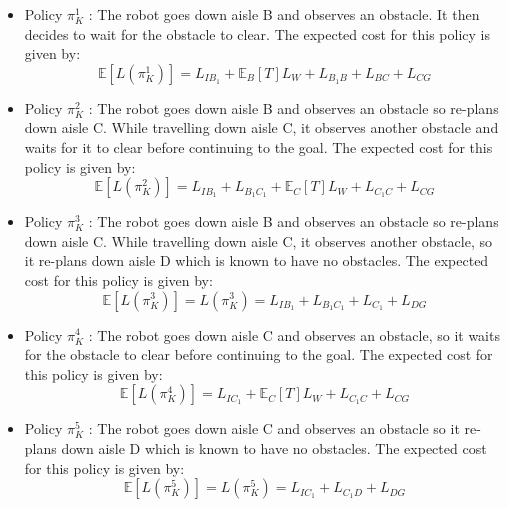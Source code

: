 \documentclass[a4paper,12pt]{article}
\begin{document}
			\begin{itemize}
				\item Policy $\pi_{K}^{1}$ : The robot goes down aisle B and observes an obstacle. It then decides to wait for the obstacle to clear. The expected cost for this policy is given by:
				\begin{equation}
				\mathbb{E}\left[L\left(\pi_{K}^{1}\right)\right] = L_{IB_1} + \mathbb{E}_{B}\left[T\right]L_W + L_{B_1B} + L_{BC} + L_{CG}
				\label{eqn:policyOneCost}
				\end{equation}
				
				\item Policy $\pi_{K}^{2}$ : The robot goes down aisle B and observes an obstacle so re-plans down aisle C. While travelling down aisle C, it observes another obstacle and waits for it to clear before continuing to the goal. The expected cost for this policy is given by:
				\begin{equation}
				\mathbb{E}\left[L\left(\pi_{K}^{2}\right)\right] = L_{IB_1} + L_{B_1C_1} + \mathbb{E}_{C}\left[T\right]L_W + L_{C_1C} + L_{CG}
				\label{eqn:policyTwoCost}
				\end{equation}
				
				\item Policy $\pi_{K}^{3}$ : The robot goes down aisle B and observes an obstacle so re-plans down aisle C. While travelling down aisle C, it observes another obstacle, so it re-plans down aisle D which is known to have no obstacles. The expected cost for this policy is given by:
				\begin{equation}
				\mathbb{E}\left[L\left(\pi_{K}^{3}\right)\right] = L\left(\pi_{K}^{3}\right) = L_{IB_1} + L_{B_1C_1} + L_{C_1} + L_{DG}
				\label{eqn:policyThreeCost}
				\end{equation}
				
				\item Policy $\pi_{K}^{4}$ : The robot goes down aisle C and observes an obstacle, so it waits for the obstacle to clear before continuing to the goal. The expected cost for this policy is given by:
				\begin{equation}
				\mathbb{E}\left[L\left(\pi_{K}^{4}\right)\right] = L_{IC_1} + \mathbb{E}_{C}\left[T\right]L_W + L_{C_1C} + L_{CG}
				\label{eqn:policyFourCost}
				\end{equation}
				
				\item Policy $\pi_{K}^{5}$ : The robot goes down aisle C and observes an obstacle so it re-plans down aisle D which is known to have no obstacles. The expected cost for this policy is given by:
				\begin{equation}
				\mathbb{E}\left[L\left(\pi_{K}^{5}\right)\right] = L\left(\pi_{K}^{5}\right) = L_{IC_1} + L_{C_1D} + L_{DG}
				\label{eqn:policyFiveCost}
				\end{equation}
				

\end{itemize}
\end{document}
